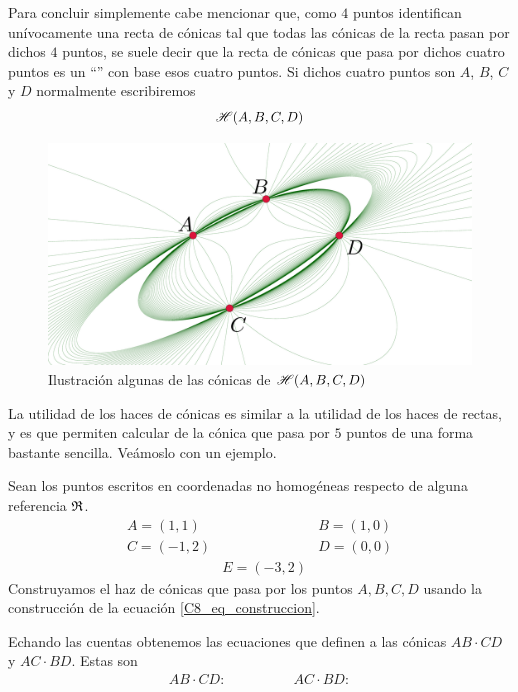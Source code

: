 Para concluir simplemente cabe mencionar que, como $4$ puntos identifican unívocamente una recta de cónicas tal que todas las cónicas de la recta pasan por dichos $4$ puntos, se suele decir que la recta de cónicas que pasa por dichos cuatro puntos es un ``'' con base esos cuatro puntos. Si dichos cuatro puntos son $A$, $B$, $C$ y $D$ normalmente escribiremos
\begin{equation}
	\mathscr{H}(A,B,C,D)
\end{equation}

\begin{figure}[h]
	\centering
	\includegraphics[scale=.05]{Graficos/HazDeConicasPorCuatroPuntos.eps}
	\caption{Ilustración algunas de las cónicas de $\mathscr{H}(A,B,C,D)$}
	\label{C8_img_haz2}
\end{figure}

La utilidad de los haces de cónicas es similar a la utilidad de los haces de rectas, y es que permiten calcular de la cónica que pasa por $5$ puntos de una forma bastante sencilla. Veámoslo con un ejemplo.
\begin{exa}
	Sean los puntos escritos en coordenadas no homogéneas respecto de alguna referencia $\mathfrak{R}$.
	\[\begin{array}{ccc}
		A=(1,1)&&B=(1,0)\\
		C=(-1,2)&&D=(0,0)\\
		&E=(-3,2)&
	\end{array}\]
	Construyamos el haz de cónicas que pasa por los puntos $A,B,C,D$ usando la construcción de la ecuación \eqref{C8_eq_construccion}.
	
	Echando las cuentas obtenemos las ecuaciones que definen a las cónicas $AB\cdot CD$ y $AC\cdot BD$. Estas son
	\begin{equation*}
		\begin{array}{cc}
			AB\cdot CD : \qquad&\qquad AC\cdot BD :
		\end{array}
	\end{equation*}
\end{exa}

